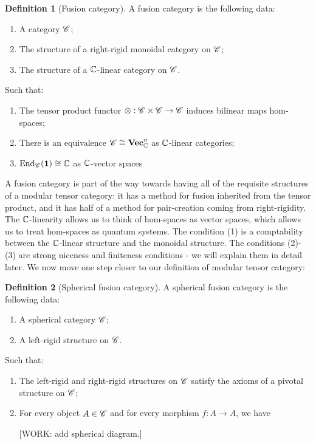 \documentclass{article}
\theoremstyle{definition}
\newtheorem*{definition}{Definition}
\numberwithin{figure}{section}
\begin{document}
\begin{definition}[Fusion category] A fusion category is the following data:

\begin{enumerate}
\item A category $\mathscr{C}$;
\item The structure of a right-rigid monoidal category on $\mathscr{C}$;
\item The structure of a $\mathbb{C}$-linear category on $\mathscr{C}$.
\end{enumerate}

Such that:

\begin{enumerate}
\item The tensor product functor $\otimes: \mathscr{C}\times \mathscr{C}\to \mathscr{C}$ induces bilinear maps hom-spaces;
\item There is an equivalence $\mathscr{C} \cong \mathbf{Vec}_{\mathbb{C}}^n$ as $\mathbb{C}$-linear categories;
\item $\mathrm{End}_{\mathscr{C}}(\mathbf{1})\cong \mathbb{C}$ as $\mathbb{C}$-vector spaces
\end{enumerate}

\raggedleft\qedsymbol{}
\end{definition}

A fusion category is part of the way towards having all of the requisite structures of a modular tensor category: it has a method for fusion inherited from the tensor product, and it has half of a method for pair-creation coming from right-rigidity. The $\mathbb{C}$-linearity allows us to think of hom-spaces as vector spaces, which allows us to treat hom-spaces as quantum systems. The condition (1) is a comptability between the $\mathbb{C}$-linear structure and the monoidal structure. The conditions (2)-(3) are strong niceness and finiteness conditions - we will explain them in detail later. We now move one step closer to our definition of modular tensor category:

\begin{definition}[Spherical fusion category] A spherical fusion category is the following data:

\begin{enumerate}
\item A spherical category $\mathscr{C}$;
\item A left-rigid structure on $\mathscr{C}$.
\end{enumerate}

Such that:

\begin{enumerate}
\item The left-rigid and right-rigid structures on $\mathscr{C}$ satisfy the axioms of a pivotal structure on $\mathscr{C}$;
\item For every object $A\in \mathscr{C}$ and for every morphism $f: A \to A$, we have

[WORK: add spherical diagram.]
\end{enumerate}

\raggedleft\qedsymbol{}
\end{definition}
\end{document}
